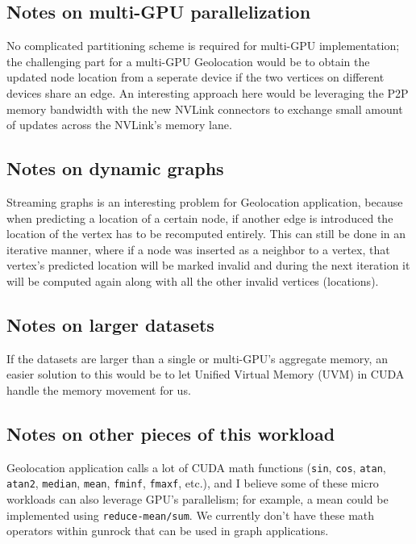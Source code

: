 \documentclass[10pt,article,oneside]{memoir}
\begin{document}
\subsection{Notes on multi-GPU
parallelization}\label{notes-on-multi-gpu-parallelization}

No complicated partitioning scheme is required for multi-GPU
implementation; the challenging part for a multi-GPU Geolocation would
be to obtain the updated node location from a seperate device if the two
vertices on different devices share an edge. An interesting approach
here would be leveraging the P2P memory bandwidth with the new NVLink
connectors to exchange small amount of updates across the NVLink's
memory lane.

\subsection{Notes on dynamic graphs}\label{notes-on-dynamic-graphs}

Streaming graphs is an interesting problem for Geolocation application,
because when predicting a location of a certain node, if another edge is
introduced the location of the vertex has to be recomputed entirely.
This can still be done in an iterative manner, where if a node was
inserted as a neighbor to a vertex, that vertex's predicted location
will be marked invalid and during the next iteration it will be computed
again along with all the other invalid vertices (locations).

\subsection{Notes on larger datasets}\label{notes-on-larger-datasets}

If the datasets are larger than a single or multi-GPU's aggregate
memory, an easier solution to this would be to let Unified Virtual
Memory (UVM) in CUDA handle the memory movement for us.

\subsection{Notes on other pieces of this
workload}\label{notes-on-other-pieces-of-this-workload}

Geolocation application calls a lot of CUDA math functions
(\texttt{sin}, \texttt{cos}, \texttt{atan}, \texttt{atan2},
\texttt{median}, \texttt{mean}, \texttt{fminf}, \texttt{fmaxf}, etc.),
and I believe some of these micro workloads can also leverage GPU's
parallelism; for example, a mean could be implemented using
\texttt{reduce-mean/sum}. We currently don't have these math operators
within gunrock that can be used in graph applications.
\end{document}
